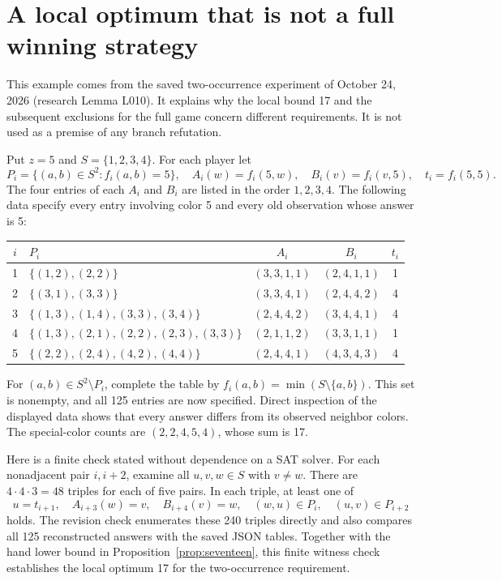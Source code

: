 \section{A local optimum that is not a full winning strategy}\label{app:witness}
This example comes from the saved two-occurrence experiment of
October 24, 2026 (research Lemma L010). It explains why the local bound
17 and the subsequent exclusions for the full game concern different
requirements. It is not used as a premise of any branch refutation.

Put $z=5$ and $S=\{1,2,3,4\}$. For each player let
\[
P_i=\{(a,b)\in S^2:f_i(a,b)=5\},\quad
A_i(w)=f_i(5,w),\quad B_i(v)=f_i(v,5),\quad t_i=f_i(5,5).
\]
The four entries of each $A_i$ and $B_i$ are listed in the order
$1,2,3,4$. The following data specify every entry involving color 5 and
every old observation whose answer is 5:
\begin{center}\small
\begin{tabular}{@{}clccc@{}}
\toprule
$i$&$P_i$&$A_i$&$B_i$&$t_i$\\
\midrule
1&$\{(1,2),(2,2)\}$&$(3,3,1,1)$&$(2,4,1,1)$&1\\
2&$\{(3,1),(3,3)\}$&$(3,3,4,1)$&$(2,4,4,2)$&4\\
3&$\{(1,3),(1,4),(3,3),(3,4)\}$&$(2,4,4,2)$&$(3,4,4,1)$&4\\
4&$\{(1,3),(2,1),(2,2),(2,3),(3,3)\}$&$(2,1,1,2)$&$(3,3,1,1)$&1\\
5&$\{(2,2),(2,4),(4,2),(4,4)\}$&$(2,4,4,1)$&$(4,3,4,3)$&4\\
\bottomrule
\end{tabular}
\end{center}
For $(a,b)\in S^2\setminus P_i$, complete the table by
$f_i(a,b)=\min(S\setminus\{a,b\})$. This set is nonempty, and all
125 entries are now specified. Direct inspection of the displayed data
shows that every answer differs from its observed neighbor colors.
The special-color counts are $(2,2,4,5,4)$, whose sum is 17.

Here is a finite check stated without dependence on a SAT solver.
For each nonadjacent pair $i,i+2$, examine all
$u,v,w\in S$ with $v\ne w$. There are $4\cdot4\cdot3=48$
triples for each of five pairs. In each triple, at least one of
\[
u=t_{i+1},\quad A_{i+3}(w)=v,\quad B_{i+4}(v)=w,\quad
(w,u)\in P_i,\quad(u,v)\in P_{i+2}
\]
holds. The revision check enumerates these 240 triples directly and also
compares all 125 reconstructed answers with the saved JSON tables.
Together with the hand lower bound in Proposition~\ref{prop:seventeen},
this finite witness check establishes the local optimum 17 for the
two-occurrence requirement.

